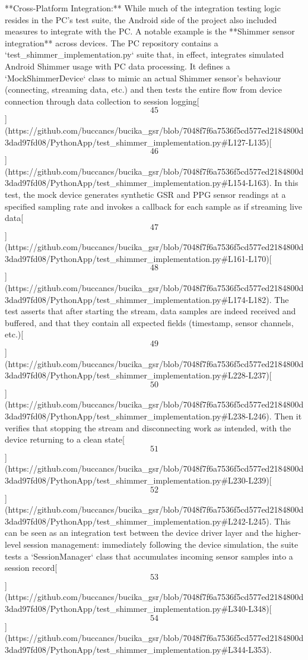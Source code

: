 \documentclass[12pt,a4paper]{article}
\begin{document}
{**Cross-Platform Integration:** While much of the integration testing
logic resides in the PC's test suite, the Android side of the project
also included measures to integrate with the PC. A notable example is
the **Shimmer sensor integration** across devices. The PC repository
contains a `test_shimmer_implementation.py` suite that, in effect,
integrates simulated Android Shimmer usage with PC data processing. It
defines a `MockShimmerDevice` class to mimic an actual Shimmer sensor's
behaviour (connecting, streaming data, etc.) and then tests the entire
flow from device connection through data collection to session
logging[\[45\]](https://github.com/buccancs/bucika_gsr/blob/7048f7f6a7536f5cd577ed2184800d3dad97fd08/PythonApp/test_shimmer_implementation.py#L127-L135)[\[46\]](https://github.com/buccancs/bucika_gsr/blob/7048f7f6a7536f5cd577ed2184800d3dad97fd08/PythonApp/test_shimmer_implementation.py#L154-L163).
In this test, the mock device generates synthetic GSR and PPG sensor
readings at a specified sampling rate and invokes a callback for each
sample as if streaming live
data[\[47\]](https://github.com/buccancs/bucika_gsr/blob/7048f7f6a7536f5cd577ed2184800d3dad97fd08/PythonApp/test_shimmer_implementation.py#L161-L170)[\[48\]](https://github.com/buccancs/bucika_gsr/blob/7048f7f6a7536f5cd577ed2184800d3dad97fd08/PythonApp/test_shimmer_implementation.py#L174-L182).
The test asserts that after starting the stream, data samples are indeed
received and buffered, and that they contain all expected fields
(timestamp, sensor channels,
etc.)[\[49\]](https://github.com/buccancs/bucika_gsr/blob/7048f7f6a7536f5cd577ed2184800d3dad97fd08/PythonApp/test_shimmer_implementation.py#L228-L237)[\[50\]](https://github.com/buccancs/bucika_gsr/blob/7048f7f6a7536f5cd577ed2184800d3dad97fd08/PythonApp/test_shimmer_implementation.py#L238-L246).
Then it verifies that stopping the stream and disconnecting work as
intended, with the device returning to a clean
state[\[51\]](https://github.com/buccancs/bucika_gsr/blob/7048f7f6a7536f5cd577ed2184800d3dad97fd08/PythonApp/test_shimmer_implementation.py#L230-L239)[\[52\]](https://github.com/buccancs/bucika_gsr/blob/7048f7f6a7536f5cd577ed2184800d3dad97fd08/PythonApp/test_shimmer_implementation.py#L242-L245).
This can be seen as an integration test between the device driver layer
and the higher-level session management: immediately following the
device simulation, the suite tests a `SessionManager` class that
accumulates incoming sensor samples into a session
record[\[53\]](https://github.com/buccancs/bucika_gsr/blob/7048f7f6a7536f5cd577ed2184800d3dad97fd08/PythonApp/test_shimmer_implementation.py#L340-L348)[\[54\]](https://github.com/buccancs/bucika_gsr/blob/7048f7f6a7536f5cd577ed2184800d3dad97fd08/PythonApp/test_shimmer_implementation.py#L344-L353).
}
\end{document}

